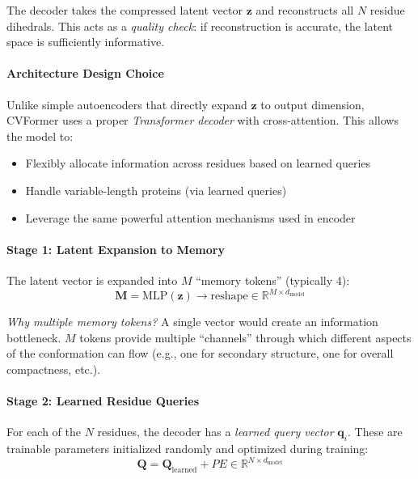\documentclass[12pt,a4paper]{article}
\begin{document}
The decoder takes the compressed latent vector $\mathbf{z}$ and reconstructs all $N$ residue dihedrals. This acts as a \textit{quality check}: if reconstruction is accurate, the latent space is sufficiently informative.

\paragraph{Architecture Design Choice}
Unlike simple autoencoders that directly expand $\mathbf{z}$ to output dimension, CVFormer uses a proper \textit{Transformer decoder} with cross-attention. This allows the model to:
\begin{itemize}
    \item Flexibly allocate information across residues based on learned queries
    \item Handle variable-length proteins (via learned queries)
    \item Leverage the same powerful attention mechanisms used in encoder
\end{itemize}

\paragraph{Stage 1: Latent Expansion to Memory}
The latent vector is expanded into $M$ ``memory tokens'' (typically 4):
\begin{equation}
\mathbf{M} = \text{MLP}(\mathbf{z}) \rightarrow \text{reshape} \in \mathbb{R}^{M \times d_{\text{model}}}
\end{equation}

\textit{Why multiple memory tokens?} A single vector would create an information bottleneck. $M$ tokens provide multiple ``channels'' through which different aspects of the conformation can flow (e.g., one for secondary structure, one for overall compactness, etc.).

\paragraph{Stage 2: Learned Residue Queries}
For each of the $N$ residues, the decoder has a \textit{learned query vector} $\mathbf{q}_i$. These are trainable parameters initialized randomly and optimized during training:
\begin{equation}
\mathbf{Q} = \mathbf{Q}_{\text{learned}} + PE \in \mathbb{R}^{N \times d_{\text{model}}}
\end{equation}
\end{document}
